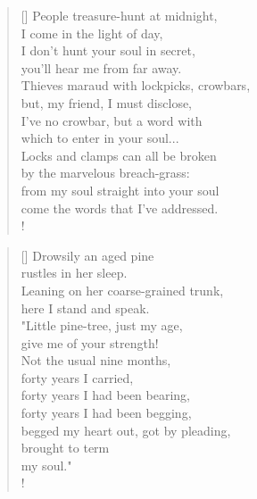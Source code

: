\documentclass[]{article}
\begin{document}
\vspace*{0.075\textheight}
\settowidth{\versewidth}{People treasure-hunt at midnight,}
\begin{verse}[\versewidth]
People treasure-hunt at midnight,\\
I come in the light of day,\\
I don't hunt your soul in secret,\\
you'll hear me from far away.\\
Thieves maraud with lockpicks, crowbars,\\
but, my friend, I must disclose,\\
I've no crowbar, but a word with\\
which to enter in your soul...\\
Locks and clamps can all be broken\\
by the marvelous breach-grass:\\
from my soul straight into your soul\\
come the words that I've addressed.\\!
\end{verse}
\bigskip \bigskip

\settowidth{\versewidth}{Little pine-tree, just my age}
\begin{verse}[\versewidth]
Drowsily an aged pine\\
rustles in her sleep.\\
Leaning on her coarse-grained trunk,\\
here I stand and speak.\\
"Little pine-tree, just my age,\\
give me of your strength!\\
Not the usual nine months,\\
forty years I carried,\\
forty years I had been bearing,\\
forty years I had been begging,\\
begged my heart out, got by pleading,\\
brought to term\\
my soul."\\!
\end{verse}
\newpage 
\end{document}
